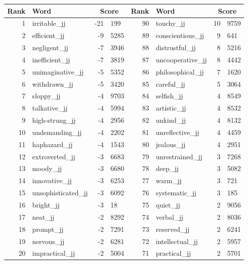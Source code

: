 \begin{table}[tbp]
    \begin{tabular}{| rlr@{.}l | rlr@{.}l |}
    \hline
    \textbf{Rank} & \textbf{Word} & \multicolumn{2}{c|}{\textbf{Score}} & \textbf{Rank} & \textbf{Word} & \multicolumn{2}{c|}{\textbf{Score}} \\
    \hline
    1 & irritable\_jj & -21 & 199    &    90 & touchy\_jj & 10 & 9759 \\
    2 & efficient\_jj & -9 & 5285    &    89 & conscientious\_jj & 9 & 641 \\
    3 & negligent\_jj & -7 & 3946    &    88 & distrustful\_jj & 8 & 5216 \\
    4 & inefficient\_jj & -7 & 3819    &    87 & uncooperative\_jj & 8 & 4442 \\
    5 & unimaginative\_jj & -5 & 5352    &    86 & philosophical\_jj & 7 & 1620 \\
    6 & withdrawn\_jj & -5 & 3420    &    85 & careful\_jj & 5 & 3064 \\
    7 & sloppy\_jj & -4 & 9703    &    84 & selfish\_jj & 4 & 8549 \\
    8 & talkative\_jj & -4 & 5994    &    83 & artistic\_jj & 4 & 8532 \\
    9 & high-strung\_jj & -4 & 2956    &    82 & unkind\_jj & 4 & 8132 \\
    10 & undemanding\_jj & -4 & 2202    &    81 & unreflective\_jj & 4 & 4459 \\
    11 & haphazard\_jj & -4 & 1543    &    80 & jealous\_jj & 4 & 2951 \\
    12 & extroverted\_jj & -3 & 6683    &    79 & unrestrained\_jj & 3 & 7268 \\
    13 & moody\_jj & -3 & 6680    &    78 & deep\_jj & 3 & 5082 \\
    14 & innovative\_jj & -3 & 6253    &    77 & warm\_jj & 3 & 721 \\
    15 & unsophisticated\_jj & -3 & 6092    &    76 & systematic\_jj & 3 & 185 \\
    16 & bright\_jj & -3 & 18    &    75 & quiet\_jj & 2 & 9056 \\
    17 & neat\_jj & -2 & 8292    &    74 & verbal\_jj & 2 & 8036 \\
    18 & prompt\_jj & -2 & 7291    &    73 & reserved\_jj & 2 & 6241 \\
    19 & nervous\_jj & -2 & 6281    &    72 & intellectual\_jj & 2 & 5957 \\
    20 & impractical\_jj & -2 & 5004    &    71 & practical\_jj & 2 & 5701 \\

\end{tabular}
\end{table}
